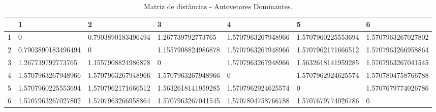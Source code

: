 \begin{table}

\centering
    \caption{Matriz de distâncias - Autovetores Dominantes.}
\begin{tabular}{|l|l|l|l|l|l|l|}
        \hline
         & 1 & 2  & 3 & 4 & 5 & 6   \\ \hline
        1   &  0 & \cellcolor{blue!25}0.7903890183496494 & \cellcolor{blue!25}1.267739792773765 & 1.5707963267948966 &  1.5707960225553694 & 1.5707963267027802\\ 
        \hline
        2   &  \cellcolor{blue!25}0.7903890183496494& 0& \cellcolor{blue!25}1.1557908824986878& 1.5707963267948966 &  1.5707962171666512 & 1.5707963266958864\\
        \hline 
        3   &  \cellcolor{blue!25}1.267739792773765 & \cellcolor{blue!25}1.1557908824986878 & 0 & 1.5707963267948966 &  1.5632618141959285 & 1.5707963267041545\\ 
        \hline
        4   &  1.5707963267948966 & 1.5707963267948966 & 1.5707963267948966 & 0 &  \cellcolor{blue!25}1.5707962924625574 & \cellcolor{blue!25}1.5707804758766788\\ 
        \hline
        5   &  1.5707960225553694 & 1.5707962171666512 & 1.5632618141959285 & \cellcolor{blue!25}1.5707962924625574 &  0 & \cellcolor{blue!25}1.5707679774026786\\ 
        \hline
        6   &  1.5707963267027802 & 1.5707963266958864 & 1.5707963267041545 & \cellcolor{blue!25}1.5707804758766788 &  \cellcolor{blue!25}1.5707679774026786 & 0\\ 
        \hline
    \end{tabular}
\label{matrizDistanciaAutoVetores}


\end{table}
